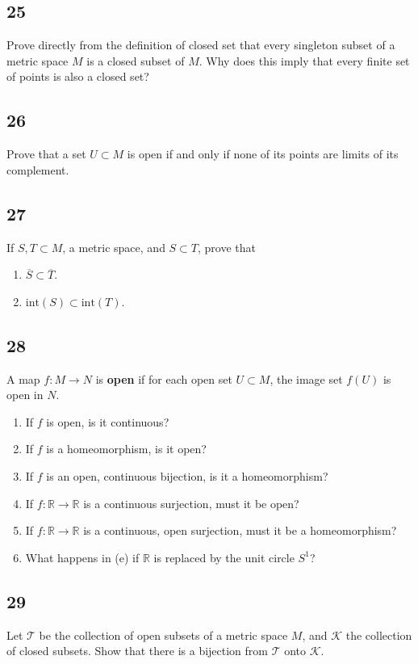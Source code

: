 \documentclass{amsart}
\begin{document}
\subsection*{25}
Prove directly from the definition of closed set that every singleton subset of a metric space $M$ is a closed subset of $M$. Why does this imply that every finite set of points is also a closed set?

\subsection*{26}
Prove that a set $U \subset M$ is open if and only if none of its points are limits of its complement.

\subsection*{27}
If $S, T \subset M$, a metric space, and $S \subset T$, prove that
\begin{enumerate}[label=(\alph*)]
\item $\overline{S} \subset \overline{T}$.
\item $\mathrm{int}(S) \subset \mathrm{int}(T)$.
\end{enumerate}

\subsection*{28}
A map $f : M \to N$ is \textbf{open} if for each open set $U \subset M$, the image set $f(U)$ is open in $N$.
\begin{enumerate}[label=(\alph*)]
\item If $f$ is open, is it continuous?
\item If $f$ is a homeomorphism, is it open?
\item If $f$ is an open, continuous bijection, is it a homeomorphism?
\item If $f : \mathbb{R} \to \mathbb{R}$ is a continuous surjection, must it be open?
\item If $f : \mathbb{R} \to \mathbb{R}$ is a continuous, open surjection, must it be a homeomorphism?
\item What happens in (e) if $\mathbb{R}$ is replaced by the unit circle $S^1$?
\end{enumerate}

\subsection*{29}
Let $\mathcal{T}$ be the collection of open subsets of a metric space $M$, and $\mathcal{K}$ the collection of closed subsets. Show that there is a bijection from $\mathcal{T}$ onto $\mathcal{K}$.
\end{document}
